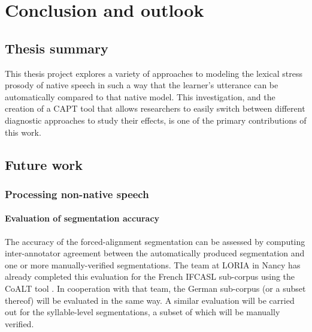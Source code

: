 %
%
\chapter{Conclusion and outlook}
\label{chap:conclusion}


\section{Thesis summary}
 \label{sec:conclusion:summary}
 
 
 This thesis project explores a variety of approaches to modeling the lexical stress prosody of native speech in such a way that the learner's utterance can be automatically compared to that native model. This investigation, and the creation of a CAPT tool that allows researchers to easily switch between different diagnostic approaches to study their effects, is one of the primary contributions of this work.

\section{Future work}
\label{sec:conclusion:future}

	\subsection{Processing non-native speech}

	\subsubsection{Evaluation of segmentation accuracy}
	
		\TODO{}

The accuracy of the forced-alignment segmentation can be assessed by computing inter-annotator agreement between the automatically produced segmentation and one or more manually-verified segmentations. The team at LORIA in Nancy has already completed this evaluation for the French IFCASL sub-corpus using the CoALT tool \citep{Fohr2012}. In cooperation with that team, the German sub-corpus (or a subset thereof) will be evaluated in the same way.
	A similar evaluation will be carried out for the syllable-level segmentations, a subset of which will be manually verified.

